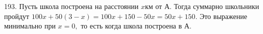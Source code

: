 193. Пусть школа построена на расстоянии $x$км от А. Тогда суммарно школьники пройдут $100x+50(3-x)=100x+150-50x=50x+150.$ Это выражение минимально при $x=0,$ то есть когда школа построена в А.\\
